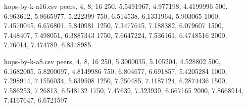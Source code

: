 \documentclass{article}
\begin{document}
%


\begin{filecontents*}{hops-by-k-a16.csv}
peers, 4, 8, 16
250, 5.5491967, 4.977198, 4.4199996
500, 6.963612, 5.8665977, 5.222399
750, 6.514538, 6.1331964, 5.903065
1000, 7.4570045, 6.676801, 5.840981
1250, 7.3477645, 7.188382, 6.079607
1500, 7.448407, 7.498051, 6.3887343
1750, 7.6647224, 7.536161, 6.4748516
2000, 7.76014, 7.474789, 6.8348985
\end{filecontents*}

\begin{filecontents*}{hops-by-k-a8.csv}
    peers, 4, 8, 16
    250, 5.3000035, 5.105204, 4.528802
    500, 6.1682005, 5.8200097, 4.8149986
    750, 6.804677, 6.691857, 5.4205284
    1000, 7.298914, 7.1556034, 5.639508
    1250, 7.250485, 7.1187124, 6.2874436
    1500, 7.586253, 7.26813, 6.548132
    1750, 7.47639, 7.323939, 6.667165
    2000, 7.8668914, 7.4167647, 6.6721597
    \end{filecontents*}

\hopsk
    
\end{document}
